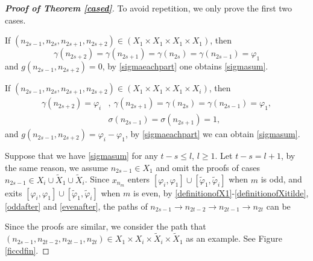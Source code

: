 \documentclass[12pt]{amsart}
\theoremstyle{plain}
\theoremstyle{definition}
\begin{document}
\begin{proof}[\textbf{Proof of Theorem \ref{cased}}]
To avoid repetition, we only prove the first two cases.

If $(n_{2s-1},n_{2s},n_{2s+1},n_{2s+2})\in \left(X_1\times X_1\times X_1\times X_1\right)$, then $$\gamma(n_{2s+2})=\gamma(n_{2s+1})=\gamma(n_{2s})=\gamma(n_{2s-1})=\varphi_1$$ 
and $g(n_{2s-1},n_{2s+2})=0$, by \eqref{sigmaeachpart} one obtains \eqref{sigmasum}.

If $(n_{2s-1},n_{2s},n_{2s+1},n_{2s+2})\in \left(X_1\times X_1\times X_1\times X_i\right)$, then
\begin{align}
	\gamma(n_{2s+2})=\varphi_i&,\ \gamma(n_{2s+1})=\gamma(n_{2s})=\gamma(n_{2s-1})=\varphi_1,\nonumber\\
	&\sigma(n_{2s-1})=\sigma(n_{2s+1})=1,\nonumber
\end{align}
and $g(n_{2s-1},n_{2s+2})=\varphi_i-\varphi_1$, by \eqref{sigmaeachpart} we can obtain \eqref{sigmasum}.


Suppose that we have \eqref{sigmasum} for any $t-s\leq l$, $l\geq 1$. Let $t-s=l+1$, by the same reason, we assume $n_{2s-1}\in X_1$ and omit the proofs of cases $n_{2s-1}\in X_i\cup\tilde{X}_1\cup\tilde{X}_i$. Since $x_{n_m}$ enters  $[\varphi_i,\varphi_1]\cup[\tilde{\varphi}_1,\tilde{\varphi}_i]$ when $m$ is odd, and exits  $[\varphi_i,\varphi_1]\cup[\tilde{\varphi}_1,\tilde{\varphi}_i]$ when $m$ is even, by \eqref{definitionofX1}-\eqref{definitionofXitilde}, \eqref{oddafter} and \eqref{evenafter}, the paths of $n_{2s-1}\to n_{2t-2}\to n_{2t-1}\to n_{2t}$ can be

\begin{figure}[H]
%
\caption{}
\end{figure}
Since the proofs are similar, we consider the path that $(n_{2s-1},n_{2t-2},n_{2t-1},n_{2t})\in X_1\times {X}_i\times \tilde{X}_i\times \tilde{X}_1$ as an example. See Figure \ref{ficcdfin}.
     


\end{proof}
\end{document}
